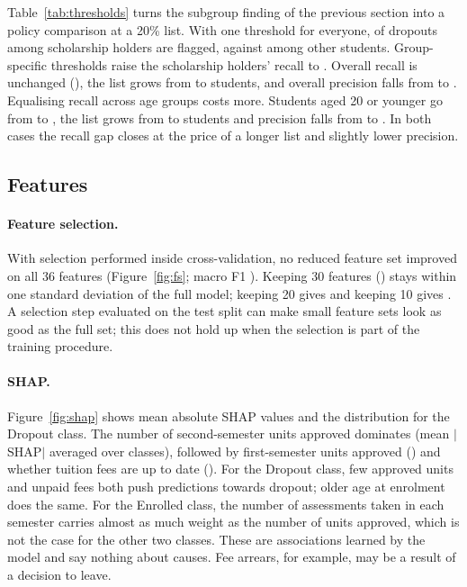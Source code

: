 \documentclass[11pt,a4paper]{article}
\begin{document}


Table~\ref{tab:thresholds} turns the subgroup finding of the previous section into a policy comparison at a 20\% list. With one threshold for everyone, \thrScholarshipYesSingleRecall{} of dropouts among scholarship holders are flagged, against \thrScholarshipNoSingleRecall{} among other students. Group-specific thresholds raise the scholarship holders' recall to \thrScholarshipYesGroupRecall{}. Overall recall is unchanged (\thrScholarshipAllGroupRecall), the list grows from \thrScholarshipAllSingleAlerts{} to \thrScholarshipAllGroupAlerts{} students, and overall precision falls from \thrScholarshipAllSinglePrecision{} to \thrScholarshipAllGroupPrecision. Equalising recall across age groups costs more. Students aged 20 or younger go from \thrAgeatenrolmentletwentySingleRecall{} to \thrAgeatenrolmentletwentyGroupRecall, the list grows from \thrAgeatenrolmentAllSingleAlerts{} to \thrAgeatenrolmentAllGroupAlerts{} students and precision falls from \thrAgeatenrolmentAllSinglePrecision{} to \thrAgeatenrolmentAllGroupPrecision. In both cases the recall gap closes at the price of a longer list and slightly lower precision.



\subsection{Features}

\paragraph{Feature selection.} With selection performed inside cross-validation, no reduced feature set improved on all 36 features (Figure~\ref{fig:fs}; macro F1 \fsFull). Keeping 30 features (\fsKthreezero) stays within one standard deviation of the full model; keeping 20 gives \fsKtwozero{} and keeping 10 gives \fsKonezero. A selection step evaluated on the test split can make small feature sets look as good as the full set; this does not hold up when the selection is part of the training procedure.

\paragraph{SHAP.} Figure~\ref{fig:shap} shows mean absolute SHAP values and the distribution for the Dropout class. The number of second-semester units approved dominates (mean $|$SHAP$|$ \shapTopOneVal{} averaged over classes), followed by first-semester units approved (\shapTopTwoVal) and whether tuition fees are up to date (\shapTopThreeVal). For the Dropout class, few approved units and unpaid fees both push predictions towards dropout; older age at enrolment does the same. For the Enrolled class, the number of assessments taken in each semester carries almost as much weight as the number of units approved, which is not the case for the other two classes. These are associations learned by the model and say nothing about causes. Fee arrears, for example, may be a result of a decision to leave.
\end{document}
